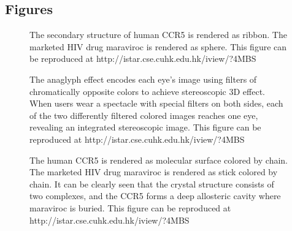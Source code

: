 \documentclass[twocolumn]{bmcart}%
\begin{document}
\begin{backmatter}




\section*{Figures}
  \begin{figure}[h!]
  \caption{
      The secondary structure of human CCR5 is rendered as ribbon. The marketed HIV drug maraviroc is rendered as sphere. This figure can be reproduced at http://istar.cse.cuhk.edu.hk/iview/?4MBS
}\label{fig:ribbon}
      \end{figure}

  \begin{figure}[h!]
  \caption{
      The anaglyph effect encodes each eye's image using filters of chromatically opposite colors to achieve stereoscopic 3D effect. When users wear a spectacle with special filters on both sides, each of the two differently filtered colored images reaches one eye, revealing an integrated stereoscopic image. This figure can be reproduced at http://istar.cse.cuhk.edu.hk/iview/?4MBS
}\label{fig:anaglyph}
      \end{figure}


  \begin{figure}[h!]
  \caption{
      The human CCR5 is rendered as molecular surface colored by chain. The marketed HIV drug maraviroc is rendered as stick colored by chain. It can be clearly seen that the crystal structure consists of two complexes, and the CCR5 forms a deep allosteric cavity where maraviroc is buried. This figure can be reproduced at http://istar.cse.cuhk.edu.hk/iview/?4MBS}\label{fig:surface}
      \end{figure}


\end{backmatter}
\end{document}
